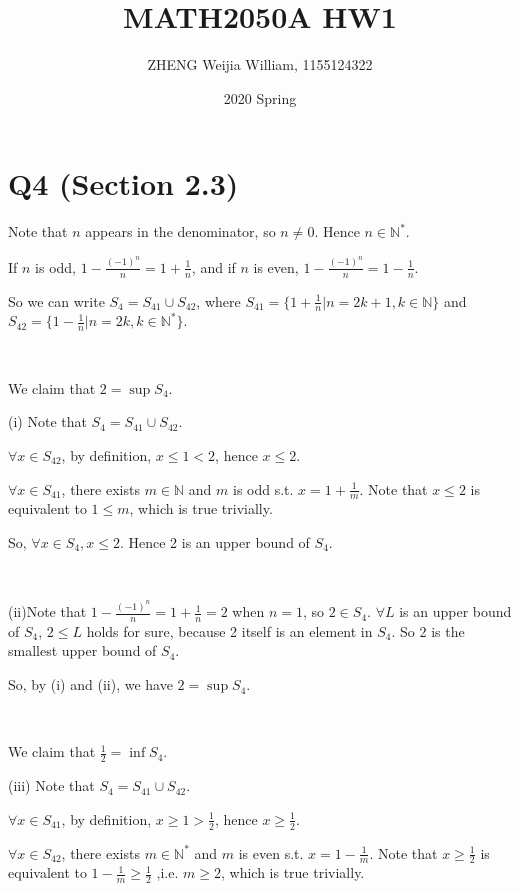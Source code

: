 \documentclass[12pt]{article}%
\begin{document}
\title{MATH2050A HW1}
\author{ZHENG Weijia William, 1155124322}
\date{2020 Spring}
\maketitle

\section{Q4 (Section 2.3)}

Note that $n$ appears in the denominator, so $n \neq 0$. Hence $n \in \mathbb{N}^*$.

If $n$ is odd, $1-\frac{(-1)^n}{n}=1+\frac{1}{n}$, and if $n$ is even, $1-\frac{(-1)^n}{n}=1-\frac{1}{n}$. 

So we can write $S_4 = S_{41} \cup S_{42}$, where $S_{41}=\{1+\frac{1}{n}| n=2k+1, k \in \mathbb{N}\}$ and $S_{42}=\{1-\frac{1}{n}| n=2k, k \in \mathbb{N}^*\}$. 

~\

We claim that  $2=\sup{S_4}$. 

(i) Note that $S_4 =S_{41} \cup S_{42} $. 

$\forall x \in S_{42}$, by definition, $x \leq 1 < 2$, hence $x \leq 2$. 

$\forall x \in S_{41}$, there exists $m \in \mathbb{N}$ and $m$ is odd s.t. $x=1+\frac{1}{m}$. Note that $x \leq 2$ is equivalent to $1\leq m$, which is true trivially. 

So, $\forall x \in S_{4}, x \leq 2$. Hence 2 is an upper bound of $S_4$. 

~\

(ii)Note that $1-\frac{(-1)^n}{n}=1+\frac{1}{n}=2$ when $n=1$, so $2\in S_4$. $\forall L$ is an upper bound of $S_4$, $2 \leq L$ holds for sure, because 2 itself is an element in $S_4$. So 2 is the smallest upper bound of $S_4$. 

So, by (i) and (ii), we have $2 = \sup{S_4}$. 

~\

We claim that $\frac{1}{2}=\inf{S_4}$. 

(iii) Note that $S_4 =S_{41} \cup S_{42} $. 

$\forall x \in S_{41}$, by definition, $x \geq 1 > \frac{1}{2}$, hence $x \geq \frac{1}{2}$. 

$\forall x \in S_{42}$, there exists $m \in \mathbb{N}^*$ and $m$ is even s.t. $x=1-\frac{1}{m}$. Note that $x \geq \frac{1}{2}$ is equivalent to $1-\frac{1}{m} \geq \frac{1}{2}$ ,i.e. $m \geq 2$, which is true trivially. 
\end{document}
